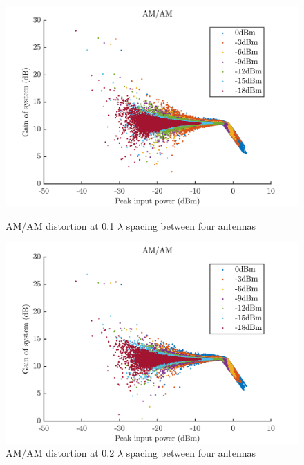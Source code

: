 \begin{figure}[H]
  \centering
  \begin{minipage}[b]{0.5\textwidth}
	\includegraphics[scale = 0.5]{figures/measurement/four_antenna/amam_0p1.png}
	\caption{AM/AM distortion at 0.1 $\lambda$ spacing between four antennas}
    \label{fig:amam01_4}
  \end{minipage}
  \hfill
  \begin{minipage}[b]{0.4\textwidth}
\includegraphics[scale = 0.5]{figures/measurement/four_antenna/amam_0p2.png}
\caption{AM/AM distortion at 0.2 $\lambda$ spacing between four antennas}
    \label{fig:amam02_4}
  \end{minipage}
\end{figure}

